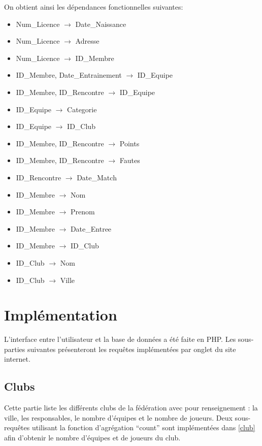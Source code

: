 \documentclass[a4paper»,8pt,french,fleqn]{report}
\begin{document}
On obtient ainsi les dépendances fonctionnelles suivantes: \\

\begin{itemize}

\item Num\_Licence $\rightarrow$ Date\_Naissance
\item Num\_Licence $\rightarrow$ Adresse
\item Num\_Licence $\rightarrow$ ID\_Membre
\item ID\_Membre, Date\_Entrainement $\rightarrow$ ID\_Equipe
\item ID\_Membre, ID\_Rencontre $\rightarrow$ ID\_Equipe
\item ID\_Equipe $\rightarrow$ Categorie
\item ID\_Equipe $\rightarrow$ ID\_Club
\item ID\_Membre, ID\_Rencontre $\rightarrow$ Points
\item ID\_Membre, ID\_Rencontre $\rightarrow$ Fautes
\item ID\_Rencontre $\rightarrow$ Date\_Match
\item ID\_Membre $\rightarrow$ Nom
\item ID\_Membre $\rightarrow$ Prenom
\item ID\_Membre $\rightarrow$ Date\_Entree
\item ID\_Membre $\rightarrow$ ID\_Club
\item ID\_Club $\rightarrow$ Nom
\item ID\_Club $\rightarrow$ Ville

\end{itemize}

\chapter{Implémentation}

L'interface entre l'utilisateur et la base de données a été faite en PHP. Les sous-parties suivantes présenteront les requêtes implémentées par onglet du site internet.

\section{Clubs}

Cette partie liste les différents clubs de la fédération avec pour renseignement : la ville, les responsables, le nombre d'équipes et le nombre de joueurs. Deux sous-requêtes utilisant la fonction d'agrégation ``count'' sont implémentées dans \ref{club} afin d'obtenir le nombre d'équipes et de joueurs du club. 
\end{document}
